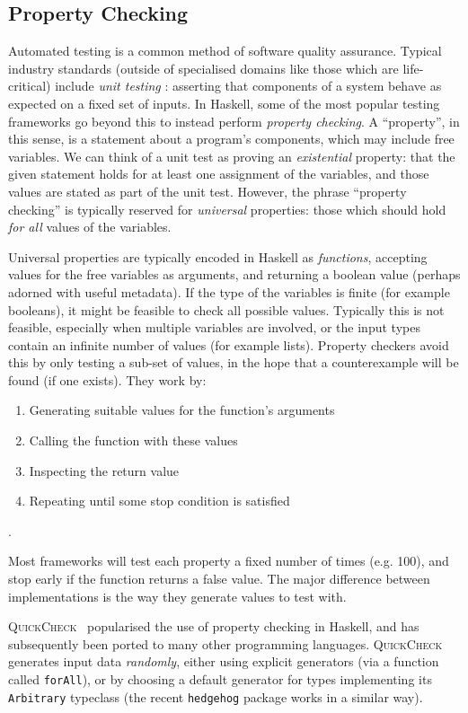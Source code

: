 \subsection{Property Checking}

Automated testing is a common method of software quality assurance. Typical
industry standards (outside of specialised domains like those which are
life-critical) include \emph{unit testing} \iffalse \cite{TODO} \fi: asserting
that components of a system behave as expected on a fixed set of inputs. In
Haskell, some of the most popular testing frameworks go beyond this to instead
perform \emph{property checking}. A ``property'', in this sense, is a statement
about a program's components, which may include free variables. We can think of
a unit test as proving an \emph{existential} property: that the given statement
holds for at least one assignment of the variables, and those values are stated
as part of the unit test. However, the phrase ``property checking'' is typically
reserved for \emph{universal} properties: those which should hold \emph{for all}
values of the variables.

Universal properties are typically encoded in Haskell as \emph{functions},
accepting values for the free variables as arguments, and returning a boolean
value (perhaps adorned with useful metadata). If the type of the variables is
finite (for example booleans), it might be feasible to check all possible
values. Typically this is not feasible, especially when multiple variables are
involved, or the input types contain an infinite number of values (for example
lists). Property checkers avoid this by only testing a sub-set of values, in the
hope that a counterexample will be found (if one exists). They work by:

\begin{enumerate}
\item Generating suitable values for the function's arguments
\item Calling the function with these values
\item Inspecting the return value
\item Repeating until some stop condition is satisfied
\end{enumerate}.

Most frameworks will test each property a fixed number of times (e.g. 100), and
stop early if the function returns a false value. The major difference between
implementations is the way they generate values to test with.

\textsc{QuickCheck}~\cite{claessen2011quickcheck} popularised the use of
property checking in Haskell, and has subsequently been ported to many other
programming languages. \textsc{QuickCheck} generates input data \emph{randomly},
either using explicit generators (via a function called \texttt{forAll}), or by
choosing a default generator for types implementing its \texttt{Arbitrary}
typeclass (the recent \texttt{hedgehog} package works in a similar way\iffalse
\cite{TODO} \fi).

